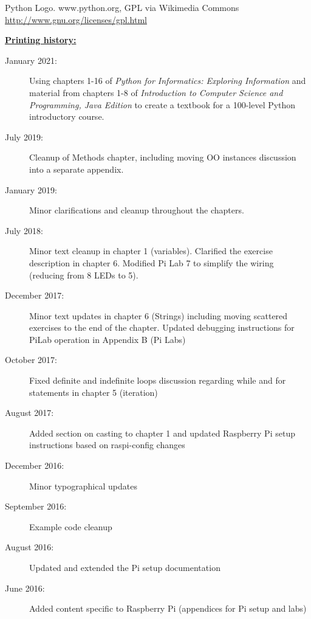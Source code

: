 \begin{latexonly}
{Python Logo. www.python.org, GPL via Wikimedia Commons
\newline
\url{http://www.gnu.org/licenses/gpl.html} 



\underline{\textbf{Printing history:}}

\begin{description}
\item[January 2021:] Using chapters 1-16 of \emph{Python for Informatics: Exploring Information} and material from chapters 1-8 of \emph{Introduction to Computer Science and Programming, Java Edition} to create a textbook for a 100-level Python introductory course.

\item[July 2019:] Cleanup of Methods chapter, including moving OO instances discussion into a separate appendix.

\item[January 2019:] Minor clarifications and cleanup throughout the chapters.

\item[July 2018:] Minor text cleanup in chapter 1 (variables). Clarified the exercise description in chapter 6. Modified Pi Lab 7 to simplify the wiring (reducing from 8 LEDs to 5).

\item[December 2017:] Minor text updates in chapter 6 (Strings) including moving scattered exercises to the end of the chapter. Updated debugging instructions for PiLab operation in Appendix B (Pi Labs)
	
\item[October 2017:] Fixed definite and indefinite loops discussion regarding while and for statements in chapter 5 (iteration)

\item[August 2017:] Added section on casting to chapter 1 and updated Raspberry Pi setup instructions based on raspi-config changes
	
\item[December 2016:] Minor typographical updates

\item[September 2016:] Example code cleanup

\item[August 2016:] Updated and extended the Pi setup documentation

\item[June 2016:] Added content specific to Raspberry Pi (appendices for Pi setup and labs)


\end{description}}
\end{latexonly}
